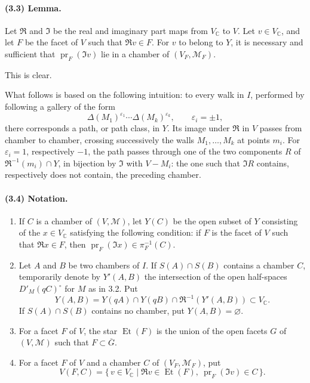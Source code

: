 \documentclass[10pt]{article}
\newcommand{\C}{\mathbb C}
\begin{document}
\paragraph{(3.3) Lemma.} Let \(\Re\) and \(\Im\) be the real and imaginary part maps from \(V_\C\) to \(V\). Let \(v\in V_\C\), and let \(F\) be the facet of \(V\) such that \(\Re v\in F\). For \(v\) to belong to \(Y\), it is necessary and sufficient that \(\operatorname{pr}_F(\Im v)\) lie in a chamber of \((V_F,\mathcal M_F)\).

This is clear.

What follows is based on the following intuition: to every walk in \(I\), performed by following a gallery of the form
\[
\Delta(M_1)^{\varepsilon_1}\cdots \Delta(M_k)^{\varepsilon_k},\qquad \varepsilon_i=\pm1,
\]
there corresponds a path, or path class, in \(Y\). Its image under \(\Re\) in \(V\) passes from chamber to chamber, crossing successively the walls \(M_1,\ldots,M_k\) at points \(m_i\). For \(\varepsilon_i=1\), respectively \(-1\), the path passes through one of the two components \(R\) of \(\Re^{-1}(m_i)\cap Y\), in bijection by \(\Im\) with \(V-M_i\): the one such that \(\Im R\) contains, respectively does not contain, the preceding chamber.

\paragraph{(3.4) Notation.}
\begin{enumerate}[label=(\roman*)]
\item If \(C\) is a chamber of \((V,\mathcal M)\), let \(Y(C)\) be the open subset of \(Y\) consisting of the \(x\in V_\C\) satisfying the following condition: if \(F\) is the facet of \(V\) such that \(\Re x\in F\), then \(\operatorname{pr}_F(\Im x)\in\pi_F^{-1}(C)\).
\item Let \(A\) and \(B\) be two chambers of \(I\). If \(S(A)\cap S(B)\) contains a chamber \(C\), temporarily denote by \(Y'(A,B)\) the intersection of the open half-spaces \(D'_M(qC)^\circ\) for \(M\) as in 3.2. Put
\[
Y(A,B)=Y(qA)\cap Y(qB)\cap \Re^{-1}(Y'(A,B))\subset V_\C.
\]
If \(S(A)\cap S(B)\) contains no chamber, put \(Y(A,B)=\varnothing\).
\item For a facet \(F\) of \(V\), the star \(\operatorname{Et}(F)\) is the union of the open facets \(G\) of \((V,\mathcal M)\) such that \(F\subset\overline G\).
\item For a facet \(F\) of \(V\) and a chamber \(C\) of \((V_F,\mathcal M_F)\), put
\[
V(F,C)=\{\,v\in V_\C\mid \Re v\in\operatorname{Et}(F),\ \operatorname{pr}_F(\Im v)\in C\,\}.
\]
\end{enumerate}
\end{document}

